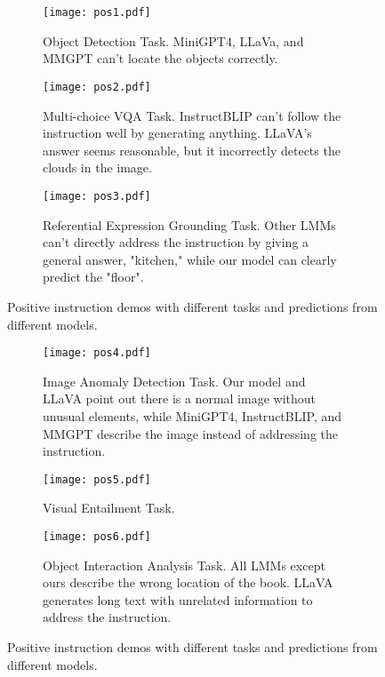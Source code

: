 \begin{figure}
     \centering
     \begin{subfigure}[b]{\textwidth}
         \centering
         \texttt{[image: pos1.pdf]}
         \caption{Object Detection Task. MiniGPT4, LLaVa, and MMGPT can't locate the objects correctly.}
         \label{fig:pos1}
     \end{subfigure}
     \par\bigskip
     \begin{subfigure}[b]{\textwidth}
         \centering
         \texttt{[image: pos2.pdf]}
         \caption{Multi-choice VQA Task. InstructBLIP can't follow the instruction well by generating anything. LLaVA's answer seems reasonable, but it incorrectly detects the clouds in the image. }
         \label{fig:pos2}
     \end{subfigure}
     \par\bigskip
     \begin{subfigure}[b]{\textwidth}
         \centering
         \texttt{[image: pos3.pdf]}
         \caption{Referential Expression Grounding Task. Other LMMs can't directly address the instruction by giving a general answer, "kitchen," while our model can clearly predict the "floor". }
         \label{fig:pos3}
     \end{subfigure}
        \caption{Positive instruction demos with different tasks and predictions from different models.}
        \label{fig:demo_pos1}
\end{figure}


\begin{figure}
     \centering
     \begin{subfigure}[b]{\textwidth}
         \centering
         \texttt{[image: pos4.pdf]}
         \caption{Image Anomaly Detection Task. Our model and LLaVA point out there is a normal image without unusual elements, while MiniGPT4, InstructBLIP, and MMGPT describe the image instead of addressing the instruction.}
         \label{fig:demo2_pos1}
     \end{subfigure}
     \par\bigskip
     \begin{subfigure}[b]{\textwidth}
         \centering
         \texttt{[image: pos5.pdf]}
         \caption{Visual Entailment Task. }
         \label{fig:demo2_pos2}
     \end{subfigure}
     \par\bigskip
     \begin{subfigure}[b]{\textwidth}
         \centering
         \texttt{[image: pos6.pdf]}
         \caption{Object Interaction Analysis Task. All LMMs except ours describe the wrong location of the book. LLaVA generates long text with unrelated information to address the instruction.}
         \label{fig:demo2_pos3}
     \end{subfigure}
        \caption{Positive instruction demos with different tasks and predictions from different models. }
        \label{fig:demo_pos2}
\end{figure}


